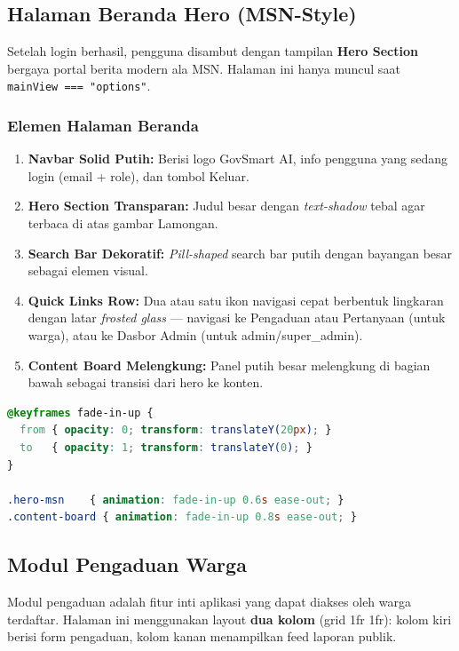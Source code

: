 \documentclass[12pt,a4paper]{article}
\begin{document}
\subsection{Halaman Beranda Hero (MSN-Style)}

Setelah login berhasil, pengguna disambut dengan tampilan \textbf{Hero Section}
bergaya portal berita modern ala MSN. Halaman ini hanya muncul saat
\texttt{mainView === "options"}.

\subsubsection{Elemen Halaman Beranda}

\begin{enumerate}[leftmargin=2em, itemsep=4pt]
  \item \textbf{Navbar Solid Putih:} Berisi logo GovSmart AI, info pengguna yang
        sedang login (email + role), dan tombol Keluar.
  \item \textbf{Hero Section Transparan:} Judul besar dengan \textit{text-shadow}
        tebal agar terbaca di atas gambar Lamongan.
  \item \textbf{Search Bar Dekoratif:} \textit{Pill-shaped} search bar putih
        dengan bayangan besar sebagai elemen visual.
  \item \textbf{Quick Links Row:} Dua atau satu ikon navigasi cepat berbentuk
        lingkaran dengan latar \textit{frosted glass} --- navigasi ke Pengaduan
        atau Pertanyaan (untuk warga), atau ke Dasbor Admin (untuk admin/super\_admin).
  \item \textbf{Content Board Melengkung:} Panel putih besar melengkung di bagian
        bawah sebagai transisi dari hero ke konten.
\end{enumerate}

\begin{lstlisting}[language=CSS, caption=Animasi entrance fade-in-up]
@keyframes fade-in-up {
  from { opacity: 0; transform: translateY(20px); }
  to   { opacity: 1; transform: translateY(0); }
}

.hero-msn    { animation: fade-in-up 0.6s ease-out; }
.content-board { animation: fade-in-up 0.8s ease-out; }
\end{lstlisting}

\subsection{Modul Pengaduan Warga}

Modul pengaduan adalah fitur inti aplikasi yang dapat diakses oleh warga terdaftar.
Halaman ini menggunakan layout \textbf{dua kolom} (grid 1fr 1fr): kolom kiri berisi
form pengaduan, kolom kanan menampilkan feed laporan publik.
\end{document}
